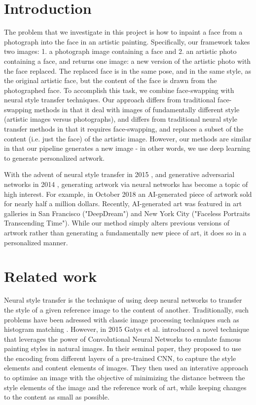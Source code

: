 \documentclass{article}
\begin{document}
\section{Introduction}  
The problem that we investigate in this project is how to inpaint a face from a photograph into the face in an artistic painting. Specifically, our framework takes two images: 1. a photograph image containing a face and 2. an artistic photo containing a face, and returns one image: a new version of the artistic photo with the face replaced. The replaced face is in the same pose, and in the same style, as the original artistic face, but the content of the face is drawn from the photographed face. To accomplish this task, we combine face-swapping with neural style transfer techniques. Our approach differs from traditional face-swapping methods in that it deal with images of fundamentally different style (artistic images versus photographs), and differs from traditional neural style transfer methods in that it requires face-swapping, and replaces a subset of the content (i.e. just the face) of the artistic image. However, our methods are similar in that our pipeline generates a new image - in other words, we use deep learning to generate personalized artwork. 

With the advent of neural style transfer in 2015 \cite{gatys2015neural}, and generative adversarial networks in 2014 \cite{gan2014}, generating artwork via neural networks has become a topic of high interest. For example, in October 2018 an AI-generated piece of artwork sold for nearly half a million dollars. Recently, AI-generated art was featured in art galleries in San Francisco ("DeepDream") and New York City ("Faceless Portraits Transcending Time"). While our method simply alters previous versions of artwork rather than generating a fundamentally new piece of art, it does so in a personalized manner.


\section{Related work}

Neural style transfer is the technique of using deep neural networks to transfer the style of a given reference image to the content of another. Traditionally, such problems have been adressed with classic image processing techniques such as histogram matching \cite{neumann2005color}. However, in 2015 Gatys et al. \cite{gatys2015neural} introduced a novel technique that leverages the power of Convolutional Neural Networks to emulate famous painting styles in natural images. In their seminal paper, they proposed to use the encoding from different layers of a pre-trained CNN, to capture the style elements and content elements of images. They then used an interative approach to optimise an image with the objective of minimizing the distance between the style elements of the image and the reference work of art, while keeping changes to the content as small as possible. 
\end{document}
